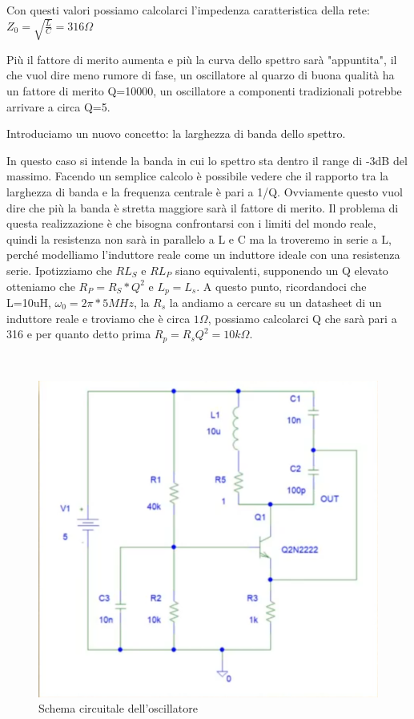 \documentclass{article}
\begin{document}
Con questi valori possiamo calcolarci l'impedenza caratteristica della rete:
$Z_0=\sqrt{\frac{L}{C}}=316\Omega$
\centering

Più il fattore di merito aumenta e più la curva dello spettro sarà "appuntita", il che vuol dire meno rumore di fase, un oscillatore al quarzo di buona qualità ha un fattore di merito Q=10000, un oscillatore a componenti tradizionali potrebbe arrivare a circa Q=5.

Introduciamo un nuovo concetto: la larghezza di banda dello spettro.

In questo caso si intende la banda in cui lo spettro sta dentro il range di -3dB del massimo.
Facendo un semplice calcolo è possibile vedere che il rapporto tra la larghezza di banda e la frequenza centrale è pari a 1/Q.
Ovviamente questo vuol dire che più la banda è stretta maggiore sarà il fattore di merito.
Il problema di questa realizzazione è che bisogna confrontarsi con i limiti del mondo reale, quindi la resistenza non sarà in parallelo a L e C ma la troveremo in serie a L, perché modelliamo l'induttore reale come un induttore ideale con una resistenza serie.
Ipotizziamo che $RL_S$ e $RL_P$ siano equivalenti, supponendo un Q elevato otteniamo che $R_P=R_S*Q^2$  e $L_p=L_s$.
A questo punto, ricordandoci che L=10uH, $\omega_0=2\pi * 5MHz$, la $R_s$ la andiamo a cercare su un datasheet di un induttore reale e troviamo che è circa $1\Omega$, possiamo calcolarci Q che sarà pari a 316 e per quanto detto prima $R_p=R_sQ^2=10k\Omega$.


~\begin{figure}[H]
\includegraphics[scale=0.8]{Oscillatore.png}
\centering
\caption{Schema circuitale dell'oscillatore}
\label{fig:foo}
\end{figure}
\end{document}
